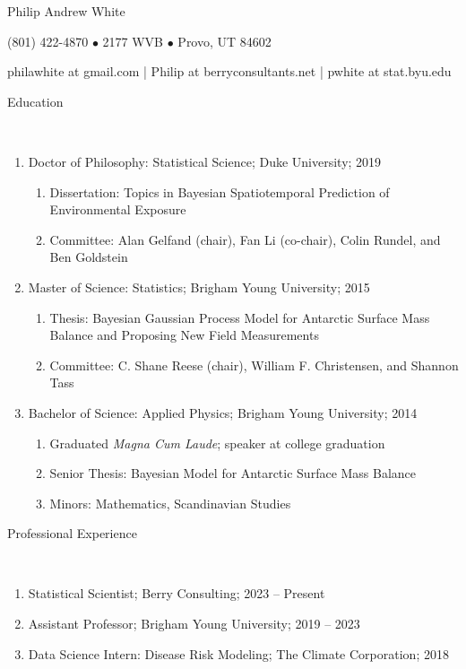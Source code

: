 \documentclass[11pt]{article}
\newcommand{\head}[1]{ %
    \bigskip %
    \begin{large}\begin{bf}{#1}\end{bf}\end{large} %

    \ \\ [-1.3cm] %

    \hrulefill}
\begin{document}

\centerline{ \LARGE Philip Andrew White }
\smallskip
\centerline{ (801) 422-4870 $\bullet$ 2177 WVB $\bullet$ Provo, UT 84602 }
\smallskip
\centerline{philawhite at gmail.com | Philip at berryconsultants.net | pwhite at stat.byu.edu }\smallskip


\head{Education}

\begin{enumerate}[label=$\bullet$]
\item Doctor of Philosophy: Statistical Science; Duke University; 2019
\begin{enumerate}[label=$\cdot$]
\item Dissertation: Topics in Bayesian Spatiotemporal Prediction of Environmental Exposure
\item Committee: Alan Gelfand (chair), Fan Li (co-chair), Colin Rundel, and Ben Goldstein
\end{enumerate}

\item Master of Science: Statistics; Brigham Young University; 2015

\begin{enumerate}[label=$\cdot$]
\item Thesis: Bayesian Gaussian Process Model for Antarctic Surface Mass Balance and Proposing New Field Measurements
\item  Committee: C. Shane Reese (chair), William F. Christensen, and Shannon Tass
\end{enumerate}

\item Bachelor of Science: Applied Physics; Brigham Young University; 2014 

\begin{enumerate}[label=$\cdot$]
\item Graduated \emph{Magna Cum Laude}; speaker at college graduation
\item Senior Thesis: Bayesian Model for Antarctic Surface Mass Balance
\item Minors: Mathematics, Scandinavian Studies
\end{enumerate}
\end{enumerate}


\head{Professional Experience}

\begin{enumerate}[label=$\bullet$]


\item Statistical Scientist; Berry Consulting; 2023 -- Present

\item Assistant Professor; Brigham Young University; 2019 -- 2023

\item Data Science Intern: Disease Risk Modeling; The Climate Corporation; 2018

\end{enumerate}
\end{document}
